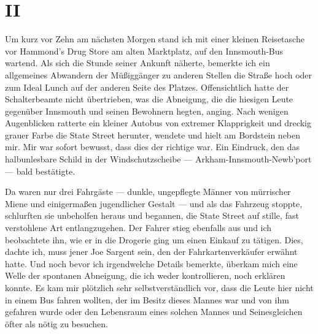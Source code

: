 \chapter*{II}

Um kurz vor Zehn am nächsten Morgen stand ich mit einer kleinen Reisetasche vor Hammond's Drug Store am alten Marktplatz, auf den Innsmouth-Bus wartend. Als sich die Stunde seiner Ankunft näherte, bemerkte ich ein allgemeines Abwandern der Müßiggänger zu anderen Stellen die Straße hoch oder zum Ideal Lunch auf der anderen Seite des Platzes. Offensichtlich hatte der Schalterbeamte nicht übertrieben, was die Abneigung, die die hiesigen Leute gegenüber Innsmouth und seinen Bewohnern hegten, anging. Nach wenigen Augenblicken ratterte ein kleiner Autobus von extremer Klapprigkeit und dreckig grauer Farbe die State Street herunter, wendete und hielt am Bordstein neben mir. Mir war sofort bewusst, dass dies der richtige war. Ein Eindruck, den das halbunlesbare Schild in der Windschutzscheibe --- \glqq Arkham-Innsmouth-Newb'port\grqq --- bald bestätigte.

Da waren nur drei Fahrgäste --- dunkle, ungepflegte Männer von mürrischer Miene und einigermaßen jugendlicher Gestalt --- und als das Fahrzeug stoppte, schlurften sie unbeholfen heraus und begannen, die State Street auf stille, fast verstohlene Art entlangzugehen. Der Fahrer stieg ebenfalls aus und ich beobachtete ihn, wie er in die Drogerie ging um einen Einkauf zu tätigen. Dies, dachte ich, muss jener Joe Sargent sein, den der Fahrkartenverkäufer erwähnt hatte. Und noch bevor ich irgendwelche Details bemerkte, überkam mich eine Welle der spontanen Abneigung, die ich weder kontrollieren, noch erklären konnte. Es kam mir plötzlich sehr selbstverständlich vor, dass die Leute hier nicht in einem Bus fahren wollten, der im Besitz dieses Mannes war und von ihm gefahren wurde oder den Lebensraum eines solchen Mannes und Seinesgleichen öfter als nötig zu besuchen.

